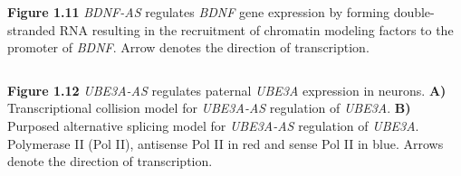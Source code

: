 \documentclass{beamer}
\begin{document}
\begin{frame}
  \begin{block}{\textbf{Figure 1.11}}
    \emph{BDNF-AS} regulates \emph{BDNF} gene expression by forming double-stranded RNA resulting in the recruitment of chromatin modeling factors to the promoter of \emph{BDNF}. Arrow denotes the direction of transcription.
  \end{block}
\end{frame}

\begin{frame}
  \begin{columns}

    \begin{block}{\textbf{Figure 1.12}}
      \emph{UBE3A-AS} regulates paternal \emph{UBE3A} expression in neurons. \textbf{A)} Transcriptional collision model for \emph{UBE3A-AS} regulation of \emph{UBE3A}. \textbf{B)} Purposed alternative splicing model for \emph{UBE3A-AS} regulation of \emph{UBE3A}. Polymerase II (Pol II), antisense Pol II in red and sense Pol II in blue. Arrows denote the direction of transcription.
    \end{block}
  \end{columns}
  
\end{frame}
\end{document}

